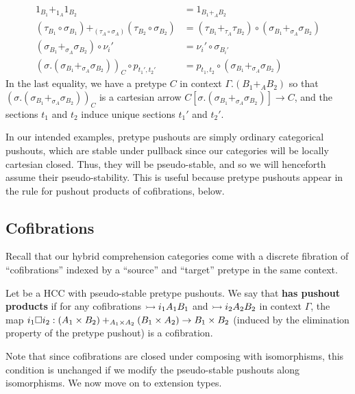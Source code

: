 \documentclass{amsart}
\begin{document}
\begin{definition}
\begin{itemize}
    \begin{align*}
      1_{B_1} +_{1_A} 1_{B_2} &= 1_{B_1 +_A B_2}\\
      (\tau_{B_1}\circ \sigma_{B_1}) +_{(\tau_A \circ \sigma_A)} (\tau_{B_2}\circ \sigma_{B_2})
      &= (\tau_{B_1} +_{\tau_A} \tau_{B_2}) \circ (\sigma_{B_1} +_{\sigma_A} \sigma_{B_2})\\
      (\sigma_{B_1} +_{\sigma_A} \sigma_{B_2}) \circ \nu_i' &= \nu_i' \circ \sigma_{B_i'}\\
      (\sigma.(\sigma_{B_1} +_{\sigma_A} \sigma_{B_2}))_C \circ p_{t_1',t_2'} &= p_{t_1,t_2} \circ (\sigma_{B_1} +_{\sigma_A} \sigma_{B_2})
    \end{align*}
    In the last equality, we have a pretype $C$ in context $\Gamma.(B_1 +_A B_2)$ so that $(\sigma.(\sigma_{B_1} +_{\sigma_A} \sigma_{B_2}))_C$ is a cartesian arrow $C[\sigma.(\sigma_{B_1} +_{\sigma_A} \sigma_{B_2})] \to C$, and the sections $t_1$ and $t_2$ induce unique sections $t_1'$ and $t_2'$.
  \end{itemize}
\end{definition}

In our intended examples, pretype pushouts are simply ordinary categorical pushouts, which are stable under pullback since our categories will be locally cartesian closed.
Thus, they will be pseudo-stable, and so we will henceforth assume their pseudo-stability.
This is useful because pretype pushouts appear in the rule for pushout products of cofibrations, below.

\subsection{Cofibrations}
\label{sec:semantic-cofibrations}

Recall that our hybrid comprehension categories come with a discrete fibration of ``cofibrations'' indexed by a ``source'' and ``target'' pretype in the same context.

\begin{definition}
  Let \E be a HCC with pseudo-stable pretype pushouts.
  We say that \E \textbf{has pushout products} if for any cofibrations $\rightarrowtail{i_1}{A_1}{B_1}$ and $\rightarrowtail{i_2}{A_2}{B_2}$ in context $\Gamma$, the map $i_1\Box i_2 : {(A_1 \times B_2) +_{A_1\times A_2} (B_1 \times A_2)} \to {B_1\times B_2}$ (induced by the elimination property of the pretype pushout) is a cofibration.
\end{definition}

Note that since cofibrations are closed under composing with isomorphisms, this condition is unchanged if we modify the pseudo-stable pushouts along isomorphisms.
We now move on to extension types.
\end{document}
